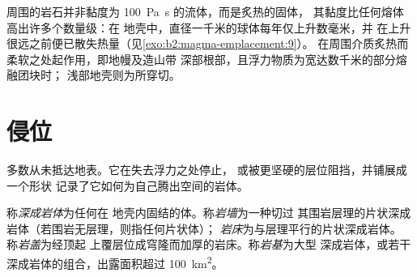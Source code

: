 周围的岩石并非黏度为 \qty{100}{Pa.s} 的流体，而是炙热的固体，
其黏度比任何熔体高出许多个数量级：在
地壳中，直径一千米的球体每年仅上升数毫米，并
在上升很远之前便已散失热量（见\cref{exo:b2:magma-emplacement:9}）。
在周围介质炙热而柔软之处起作用，即地幔及造山带
深部根部，且浮力物质为宽达数千米的部分熔融团块时；
浅部地壳则为所穿切。

\section{侵位}

多数从未抵达地表。它在失去浮力之处停止，
或被更坚硬的层位阻挡，并铺展成一个形状
记录了它如何为自己腾出空间的岩体。

\begin{definition}[侵入体]\label{def:b2:magma-emplacement:bodies}
称\emph{深成岩体}为任何在
地壳内固结的体。称\emph{岩墙}为一种切过
其围岩层理的片状深成岩体（若围岩无层理，则指任何片状体）；
\emph{岩床}为与层理平行的片状深成岩体。
称\emph{岩盖}为经顶起
上覆层位成穹隆而加厚的岩床。称\emph{岩基}为大型
深成岩体，或若干深成岩体的组合，出露面积超过 \qty{100}{km^2}。
\end{definition}

